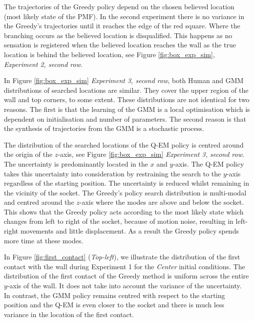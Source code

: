 The trajectories of the Greedy policy depend on the chosen believed location (most likely state of the PMF). In the 
second experiment there is no variance in the Greedy's trajectories until it reaches the edge of the red square. 
Where the branching occurs as the believed location is disqualified. This happens as  
no sensation is registered when the believed location reaches the wall as the true location is behind the believed location, see 
Figure \ref{fig:box_exp_sim}, \textit{Experiment 2, second row}.

In Figure \ref{fig:box_exp_sim} \textit{Experiment 3, second row}, both Human and GMM distributions of
searched locations are similar. They cover the upper region of the wall and top corners, to 
some extent. These distributions are not identical for two reasons. The first is that the learning of the GMM is a 
local optimisation which is dependent on initialisation and number of parameters. The second reason is that 
the synthesis of trajectories from the GMM is a stochastic process. 

The distribution of the searched locations of the Q-EM policy is centred around the origin of the $z$-axis,
see Figure \ref{fig:box_exp_sim}  \textit{Experiment 3, second row}. 
The uncertainty is predominantly located in the $x$ and $y$-axis. The Q-EM policy takes this uncertainty 
into consideration by restraining the search to the $y$-axis regardless of the starting position. The uncertainty 
is reduced whilst remaining in the vicinity of the socket. 
The Greedy's policy search distribution is multi-modal and centred around the $z$-axis where the modes are above 
and below the socket. This shows that the Greedy policy acts according to the most likely state 
which changes from left to right of the socket, because of motion noise, resulting in left-right 
movements and little displacement. As a result the Greedy policy spends more time at these modes.

In Figure \ref{fig:first_contact} (\textit{Top-left}), we illustrate the distribution of the first contact with the wall 
during Experiment 1 for the \textit{Center} initial conditions. The distribution of the first contact of the Greedy method is uniform across 
the entire $y$-axis of the wall. 
It does not take into account the variance of the uncertainty. In contrast, the GMM policy remains centred with respect to the starting position and the Q-EM is even closer to the socket and 
there is much less variance in the location of the first contact.


